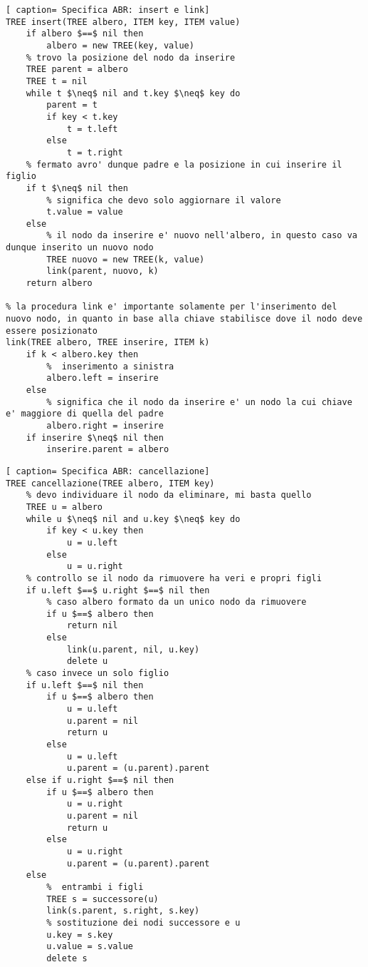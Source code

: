 \documentclass[../cheatSheetAlgoritmi.tex]{subfiles}
\begin{document}
\newpage
\begin{lstlisting}[ caption= Specifica ABR: insert e link]
TREE insert(TREE albero, ITEM key, ITEM value)
	if albero $==$ nil then
		albero = new TREE(key, value)
	% trovo la posizione del nodo da inserire
	TREE parent = albero
	TREE t = nil
	while t $\neq$ nil and t.key $\neq$ key do
	  	parent = t
		if key < t.key
    		t = t.left
		else 
			t = t.right
	% fermato avro' dunque padre e la posizione in cui inserire il figlio
	if t $\neq$ nil then
		% significa che devo solo aggiornare il valore
		t.value = value
	else
		% il nodo da inserire e' nuovo nell'albero, in questo caso va dunque inserito un nuovo nodo
		TREE nuovo = new TREE(k, value)
		link(parent, nuovo, k)
	return albero

% la procedura link e' importante solamente per l'inserimento del nuovo nodo, in quanto in base alla chiave stabilisce dove il nodo deve essere posizionato
link(TREE albero, TREE inserire, ITEM k)
	if k < albero.key then
		%  inserimento a sinistra
		albero.left = inserire
	else
		% significa che il nodo da inserire e' un nodo la cui chiave e' maggiore di quella del padre
		albero.right = inserire
	if inserire $\neq$ nil then
		inserire.parent = albero
\end{lstlisting}
\newpage
\begin{lstlisting}[ caption= Specifica ABR: cancellazione]
TREE cancellazione(TREE albero, ITEM key)
	% devo individuare il nodo da eliminare, mi basta quello
	TREE u = albero
	while u $\neq$ nil and u.key $\neq$ key do
		if key < u.key then
			u = u.left
		else
			u = u.right
	% controllo se il nodo da rimuovere ha veri e propri figli
	if u.left $==$ u.right $==$ nil then
		% caso albero formato da un unico nodo da rimuovere
		if u $==$ albero then
			return nil
		else
			link(u.parent, nil, u.key)
			delete u
	% caso invece un solo figlio
	if u.left $==$ nil then 
		if u $==$ albero then 
			u = u.left
			u.parent = nil
			return u
		else
			u = u.left
			u.parent = (u.parent).parent
	else if u.right $==$ nil then 
		if u $==$ albero then 
			u = u.right
			u.parent = nil
			return u
		else
			u = u.right
			u.parent = (u.parent).parent
	else 
		%  entrambi i figli
		TREE s = successore(u)
		link(s.parent, s.right, s.key)
		% sostituzione dei nodi successore e u
		u.key = s.key
		u.value = s.value
		delete s
\end{lstlisting}
\newpage
\end{document}
